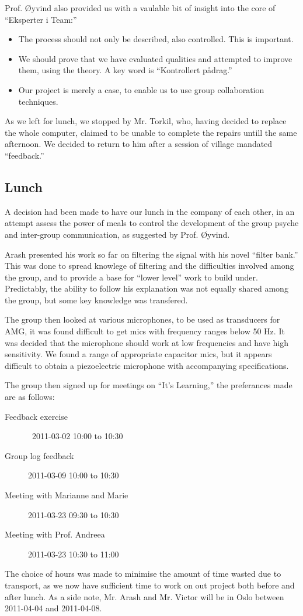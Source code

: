\documentclass[a4paper, oneside, fleqn, halfparskip]{scrartcl}
\begin{document}
Prof. Øyvind also provided us with a vaulable bit of insight into the core of ``Eksperter i Team:''
\begin{itemize}
  \item The process should not only be described, also controlled. This is important.
  \item We should prove that we have evaluated qualities and attempted to improve them, using the theory. A key word is ``Kontrollert pådrag.''
  \item Our project is merely a case, to enable us to use group collaboration techniques.
\end{itemize}

As we left for lunch, we stopped by Mr. Torkil, who, having decided to replace the whole computer, claimed to be unable to complete the repairs untill the same afternoon. We decided to return to him after a session of village mandated ``feedback.''

\subsection{Lunch}
A decision had been made to have our lunch in the company of each other, in an attempt assess the power of meals to control the development of the group psyche and inter-group communication, as suggested by Prof. Øyvind.

Arash presented his work so far on filtering the signal with his novel ``filter bank.'' This was done to spread knowlege of filtering and the difficulties involved among the group, and to provide a base for ``lower level'' work to build under. Predictably, the ability to follow his explanation was not equally shared among the group, but some key knowledge was transfered.

The group then looked at various microphones, to be used as transducers for AMG, it was found difficult to get mics with frequency ranges below 50 Hz. It was decided that the microphone should work at low frequencies and have high sensitivity. We found a range of appropriate capacitor mics, but it appears difficult to obtain a piezoelectric microphone with accompanying specifications.

The group then signed up for meetings on ``It's Learning,'' the preferances made are as follows:
\begin{description}
  \item[Feedback exercise] 2011-03-02 10:00 to 10:30
  \item[Group log feedback] 2011-03-09 10:00 to 10:30
  \item[Meeting with Marianne and Marie] 2011-03-23 09:30 to 10:30
  \item[Meeting with Prof. Andreea] 2011-03-23 10:30 to 11:00
\end{description}
The choice of hours was made to minimise the amount of time wasted due to transport, as we now have sufficient time to work on out project both before and after lunch. As a side note, Mr. Arash and Mr. Victor will be in Oslo between 2011-04-04 and 2011-04-08.
\end{document}
